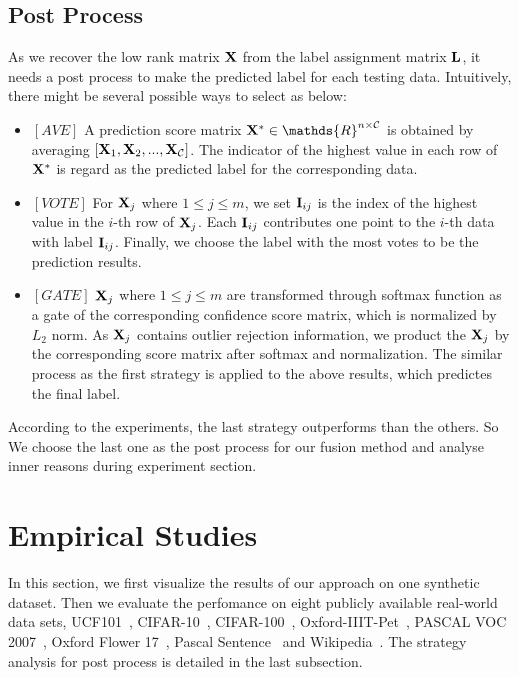 \documentclass[letterpaper]{article}
\def\bI{{\bf I}}
\def\calC{{\mathcal{C}}}
\def\bL{{\bf L}}
\def\dsR{\mathds{R}}
\def\bX{{\bf X}}
\def\bI{{\bf I}}
\def\bX{{\bf X}}
\begin{document}
\subsection{Post Process}
As we recover the low rank matrix $\bX$ from the label assignment matrix $\bL$,
it needs a post process to make the predicted label for each testing data.
Intuitively, there might be several possible ways to select as below:
\begin{itemize}
  \item $[AVE]$ A prediction score matrix $\bX^{*} \in \dsR^{n \times {\calC}}$ is obtained by averaging $[ \bX_1, \bX_2, ..., \bX_{\calC}]$.
		The indicator of the highest value in each row of $\bX^{*}$ is regard as the predicted label for the corresponding data.
  \item $[VOTE]$ For $\bX_j$ where $1 \leq j \leq m$, we set $\bI_{ij}$ is the index of the highest value in the $i$-th row of $\bX_j$.
  		Each $\bI_{ij}$ contributes one point to the $i$-th data with label $\bI_{ij}$.
  		Finally, we choose the label with the most votes to be the prediction results.
  \item $[GATE]$ $\bX_j$ where $1 \leq j \leq m$ are transformed through softmax function as a gate of the corresponding confidence score matrix, which is normalized by $L_2$ norm.
  		As $\bX_j$ contains outlier rejection information, we product the $\bX_j$ by the corresponding score matrix after softmax and normalization.
  		The similar process as the first strategy is applied to the above results, which predictes the final label.
\end{itemize}
According to the experiments, the last strategy outperforms than the others.
So We choose the last one as the post process for our fusion method and analyse inner reasons during experiment section.


\section{Empirical Studies}

In this section, we first visualize the results of our approach on one synthetic dataset.
Then we evaluate the perfomance on eight publicly available real-world data sets,
UCF101~\cite{soomro2012ucf101}, CIFAR-10~\cite{krizhevsky2009learning}, CIFAR-100~\cite{krizhevsky2009learning}, Oxford-IIIT-Pet~\cite{parkhi2012cats}, PASCAL VOC 2007~\cite{pascal-voc-2007}, Oxford Flower 17~\cite{nilsback2006visual}, Pascal Sentence~\cite{rashtchian2010collecting} and Wikipedia~\cite{rasiwasia2010new}.
The strategy analysis for post process is detailed in the last subsection.
\end{document}
